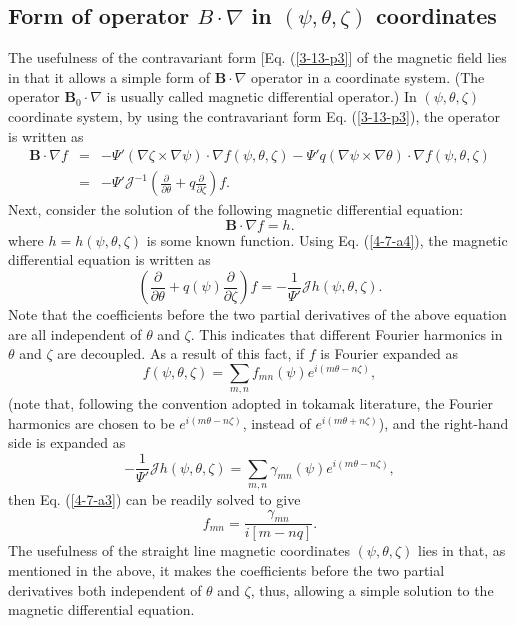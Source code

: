 \documentclass{article}
\begin{document}
\subsection{Form of operator $B \cdot \nabla$ in $(\psi, \theta, \zeta)$
coordinates}

The usefulness of the contravariant form [Eq. (\ref{3-13-p3}] of the magnetic
field lies in that it allows a simple form of $\mathbf{B} \cdot \nabla$
operator in a coordinate system. (The operator $\mathbf{B}_0 \cdot \nabla$ is
usually called magnetic differential operator.) In $(\psi, \theta, \zeta)$
coordinate system, by using the contravariant form Eq. (\ref{3-13-p3}), the
operator is written as
\begin{eqnarray}
  \mathbf{B} \cdot \nabla f & = & - \Psi' (\nabla \zeta \times \nabla \psi)
  \cdot \nabla f (\psi, \theta, \zeta) - \Psi' q (\nabla \psi \times \nabla
  \theta) \cdot \nabla f (\psi, \theta, \zeta) \nonumber\\
  & = & - \Psi' \mathcal{J}^{- 1} \left( \frac{\partial}{\partial \theta} + q
  \frac{\partial}{\partial \zeta} \right) f.  \label{4-7-a4}
\end{eqnarray}
Next, consider the solution of the following magnetic differential equation:
\begin{equation}
  \label{17-4-27-1} \mathbf{B} \cdot \nabla f = h.
\end{equation}
where $h = h (\psi, \theta, \zeta)$ is some known function. Using Eq.
(\ref{4-7-a4}), the magnetic differential equation is written as
\begin{equation}
  \label{4-7-a3} \left( \frac{\partial}{\partial \theta} + q (\psi)
  \frac{\partial}{\partial \zeta} \right) f = - \frac{1}{\Psi'} \mathcal{J}h
  (\psi, \theta, \zeta) .
\end{equation}
Note that the coefficients before the two partial derivatives of the above
equation are all independent of $\theta$ and $\zeta$. This indicates that
different Fourier harmonics in $\theta$ and $\zeta$ are decoupled. As a result
of this fact, if $f$ is Fourier expanded as
\begin{equation}
  f (\psi, \theta, \zeta) = \sum_{m, n} f_{m n} (\psi) e^{i (m \theta - n
  \zeta)},
\end{equation}
(note that, following the convention adopted in tokamak
literature{\cite{cheng1987}}, the Fourier harmonics are chosen to be $e^{i (m
\theta - n \zeta)}$, instead of $e^{i (m \theta + n \zeta)}$), and the
right-hand side is expanded as
\begin{equation}
  - \frac{1}{\Psi'} \mathcal{J}h (\psi, \theta, \zeta) = \sum_{m, n} \gamma_{m
  n} (\psi) e^{i (m \theta - n \zeta)},
\end{equation}
then Eq. (\ref{4-7-a3}) can be readily solved to give
\begin{equation}
  \label{10-6-e1} f_{m n} = \frac{\gamma_{m n}}{i [m - n q]} .
\end{equation}
The usefulness of the straight line magnetic coordinates $(\psi, \theta,
\zeta)$ lies in that, as mentioned in the above, it makes the coefficients
before the two partial derivatives both independent of $\theta$ and $\zeta$,
thus, allowing a simple solution to the magnetic differential equation.
\end{document}

